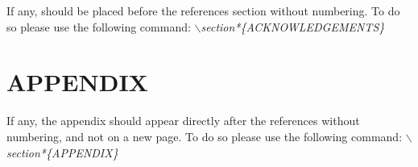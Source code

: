 \documentclass[a4paper,10pt]{article}
\begin{document}
\noindent If any, should be placed before the references section
without numbering. To do so please use the following command:
\textit{$\backslash$section*\{ACKNOWLEDGEMENTS\}}


\vfill

{\small
}


\section*{\uppercase{Appendix}}

\noindent If any, the appendix should appear directly after the
references without numbering, and not on a new page. To do so please use the following command:
\textit{$\backslash$section*\{APPENDIX\}}

\vfill
\end{document}

